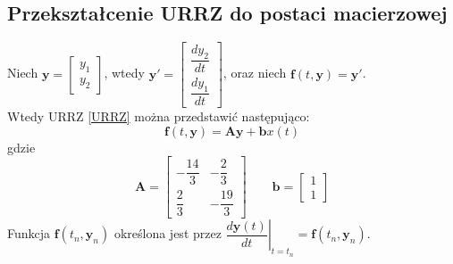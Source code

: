 \documentclass[a4paper, 12pt, twoside, openany]{article}
\newcommand{\y}{\mathbf{y}}
\newcommand{\A}{\mathbf{A}}
\renewcommand{\b}{\mathbf{b}}
\begin{document}
    \subsection{Przekształcenie URRZ do postaci macierzowej}
    Niech $ \y = \begin{bmatrix} y_1\\[1em]y_2 \end{bmatrix} $,
    wtedy $ \y' = \begin{bmatrix} \dfrac{dy_2}{dt}\\[1em]\dfrac{dy_1}{dt} \end{bmatrix} $,
    oraz niech $\mathbf{f}\left(t,\y\right) = \y'$.\\[1em]
    Wtedy URRZ \eqref{URRZ} można przedstawić następująco:
    \begin{equation}
        \label{f}
         \mathbf{f}\left(t,\y\right) = \A\y + \b x(t)
    \end{equation}
    gdzie
    $$ \A = \begin{bmatrix} -\dfrac{14}{3} & -\dfrac{2}{3}  \\[1em]\dfrac{2}{3} & -\dfrac{19}{3} \end{bmatrix} \qquad
       \b = \begin{bmatrix} 1\\1 \end{bmatrix}$$
    Funkcja $\mathbf{f}\left(t_n,\y_n\right)$ określona jest przez
    $\left. \dfrac{d\y(t)}{dt} \right|_{t=t_n} = \mathbf{f}(t_n,\y_n)$.
\end{document}
